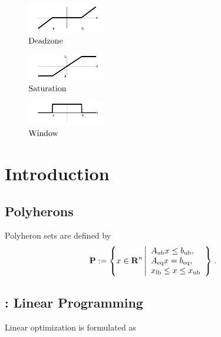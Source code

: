 \documentclass{article}
\begin{document}
    \begin{figure}[b!]
        \centering
        \includegraphics[width=0.3\textwidth]{./figs/deadzone_linear.png}
        \caption{$\text{Deadzone}$}
        \label{fig:deadzone_linear}
    \end{figure}
    \begin{figure}[b!]
        \centering
        \includegraphics[width=0.3\textwidth]{./figs/sat.png}
        \caption{$\text{Saturation}$}
        \label{fig:sat}
    \end{figure}
    \begin{figure}[b!]
        \centering
        \includegraphics[width=0.3\textwidth]{./figs/win.png}
        \caption{$\text{Window}$}
        \label{fig:deadzone_linear}
    \end{figure}

    \clearpage

\section{Introduction}

\subsection{Polyherons}
Polyheron sets are defined by
\begin{align*}
    \textbf{P} := \left\{x\in\textbf{R}^n \left|
            \begin{array}{lllllllllllllllllll}
            A_{\text{ub}} x\leq b_{\text{ub}},\\
            A_{\text{eq}} x = b_{\text{eq}},\\
            x_{\text{lb}} \leq x \leq x_{\text{ub}}
            \end{array}
    \right\}\right.. 
\end{align*}

\subsection{\LP: Linear Programming}

    Linear optimization is formulated as \cite[p.~146]{bv_cvxbook} 
\end{document}
